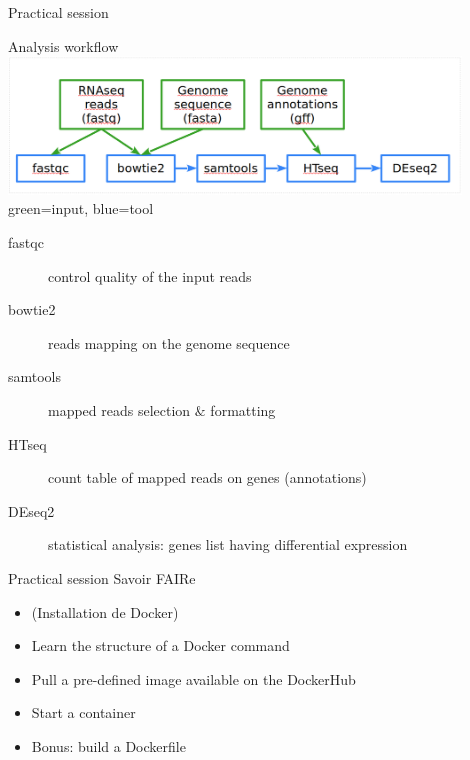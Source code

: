 \begin{frame}{Practical session}
\begin{block}{Analysis workflow}
    \includegraphics[width=12cm]{01_introduction/images/FAIR_RNAseq_WF.png}\\
green=input, blue=tool
\end{block}
\footnotesize{
\begin{description}
    \item[fastqc] control quality of the input reads
    \item[bowtie2] reads mapping on the genome sequence
    \item[samtools] mapped reads selection $\&$ formatting
    \item[HTseq] count table of mapped reads on genes (annotations)
    \item[DEseq2] statistical analysis: genes list having differential expression
\end{description}
}
\end{frame}

\begin{frame}{Practical session}
Savoir FAIRe

\begin{itemize}
  \item (Installation de Docker)
  \item Learn the structure of a Docker command
  \item Pull a pre-defined image available on the DockerHub
  \item Start a container
  \item Bonus: build a Dockerfile
\end{itemize}
\end{frame}

